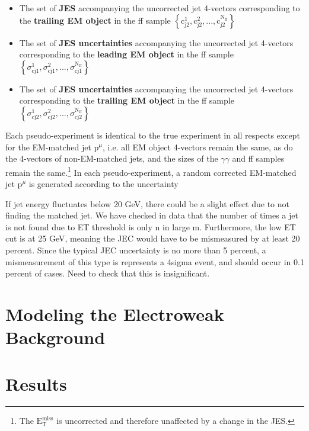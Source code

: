 \documentclass[12pt, letterpaper]{report}
\begin{document}
\begin{itemize}
  \item The set of \textbf{JES} accompanying the uncorrected jet 4-vectors corresponding to the \textbf{trailing EM object} in the ff sample $\left\{\mbox{c}_{\mbox{j}2}^{1}, \mbox{c}_{\mbox{j}2}^{2},...,\mbox{c}_{\mbox{j}2}^{\mbox{N}_{\mbox{ff}}}\right\}$
  \item The set of \textbf{JES uncertainties} accompanying the uncorrected jet 4-vectors corresponding to the \textbf{leading EM object} in the ff sample $\left\{\sigma_{\mbox{cj}1}^{1}, \sigma_{\mbox{cj}1}^{2},...,\sigma_{\mbox{cj}1}^{\mbox{N}_{\mbox{ff}}}\right\}$
  \item The set of \textbf{JES uncertainties} accompanying the uncorrected jet 4-vectors corresponding to the \textbf{trailing EM object} in the ff sample $\left\{\sigma_{\mbox{cj}2}^{1}, \sigma_{\mbox{cj}2}^{2},...,\sigma_{\mbox{cj}2}^{\mbox{N}_{\mbox{ff}}}\right\}$
\end{itemize}

 Each pseudo-experiment is identical to the true experiment in all respects except for the EM-matched jet $\mbox{p}^{\mu}$, i.e. all EM object 4-vectors remain the same, as do the 4-vectors of non-EM-matched jets, and the sizes of the $\gamma\gamma$ and ff samples remain the same.\footnote{The $\mbox{E}_{\mbox{T}}^{\mbox{miss}}$ is uncorrected and therefore unaffected by a change in the JES.}  In each pseudo-experiment, a random corrected EM-matched jet $\mbox{p}^{\mu}$ is generated according to the uncertainty

If jet energy fluctuates below 20 GeV, there could be a slight effect due to not finding the matched jet.  We have checked in data that the number of times a jet is not found due to ET threshold is only n in large m.  Furthermore, the low ET cut is at 25 GeV, meaning the JEC would have to be mismeasured by at least 20 percent.  Since the typical JEC uncertainty is no more than 5 percent, a mismeasurement of this type is represents a 4sigma event, and should occur in 0.1 percent of cases.  Need to check that this is insignificant.

\section{Modeling the Electroweak Background}
\section{Results}
\end{document}
